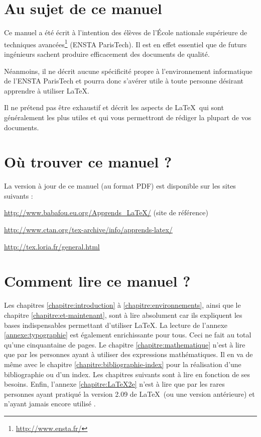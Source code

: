 \documentclass[a4paper,11pt,openbib]{book}
\newenvironment{toile}
{%
   \def\FrameCommand{\textcolor[gray]{0.7}{\vrule width 3pt}\hspace{0.7em}}%
   \MakeFramed{\advance\hsize-\width \FrameRestore}%
}%
{\endMakeFramed}
\newcommand{\toileurl}[1]{\noindent\url{#1}\par}
\begin{document}
\section*{Au sujet de ce manuel}

Ce manuel a été écrit à l'intention des élèves de l'École nationale supérieure
de techniques avancées\footnote{\url{http://www.ensta.fr/}} (ENSTA ParisTech).
Il est en effet essentiel que de futurs ingénieurs sachent produire efficacement
des documents de qualité.

Néanmoins, il ne décrit aucune spécificité propre à l'environnement informatique
de l'ENSTA ParisTech et pourra donc s'avérer utile à toute personne désirant
apprendre à utiliser \LaTeX.

Il ne prétend pas être exhaustif et décrit les aspects de \LaTeX\ qui sont
généralement les plus utiles et qui vous permettront de rédiger la plupart de
vos documents.

\section*{Où trouver ce manuel ?}

La version à jour de ce manuel (au format PDF) est disponible sur les sites
suivants :

\begin{toile}
\noindent\url{http://www.babafou.eu.org/Apprends_LaTeX/} (site de
référence)\par
\toileurl{http://www.ctan.org/tex-archive/info/apprends-latex/}
\toileurl{http://tex.loria.fr/general.html}
\end{toile}

\section*{Comment lire ce manuel ?}

Les chapitres \ref{chapitre:introduction} à \ref{chapitre:environnements}, ainsi
que le chapitre \ref{chapitre:et-maintenant}, sont à lire absolument car ils
expliquent les bases indispensables permettant d'utiliser \LaTeX. La lecture de
l'annexe \ref{annexe:typographie} est également enrichissante pour tous. Ceci ne
fait au total qu'une cinquantaine de pages. Le chapitre
\ref{chapitre:mathematique} n'est à lire que par les personnes ayant à utiliser
des expressions mathématiques. Il en va de même avec le chapitre
\ref{chapitre:bibliographie-index} pour la réalisation d'une bibliographie ou
d'un index. Les chapitres suivants sont à lire en fonction de ses besoins.
Enfin, l'annexe \ref{chapitre:LaTeX2e} n'est à lire que par les rares personnes
ayant pratiqué la version 2.09 de \LaTeX\ (ou une version antérieure) et n'ayant
jamais encore utilisé \LaTeXe.
\end{document}
